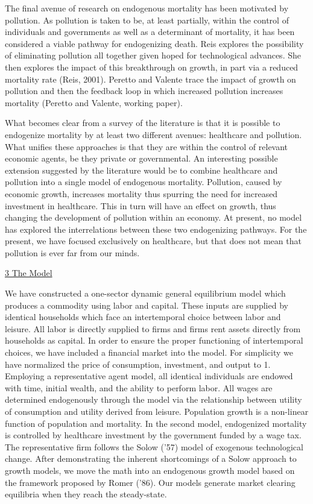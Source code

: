\documentclass[12pt]{article}%
\begin{document}
	The final avenue of research on endogenous mortality has been motivated by pollution. As pollution is taken to be, at least partially, within the control of individuals and governments as well as a determinant of mortality, it has been considered a viable pathway for endogenizing death. Reis explores the possibility of eliminating pollution all together given hoped for technological advances. She then explores the impact of this breakthrough on growth, in part via a reduced mortality rate (Reis, 2001). Peretto and Valente trace the impact of growth on pollution and then the feedback loop in which increased pollution increases mortality (Peretto and Valente, working paper).

	What becomes clear from a survey of the literature is that it is possible to endogenize mortality by at least two different avenues: healthcare and pollution. What unifies these approaches is that they are within the control of relevant economic agents, be they private or governmental. An interesting possible extension suggested by the literature would be to combine healthcare and pollution into a single model of endogenous mortality. Pollution, caused by economic growth, increases mortality thus spurring the need for increased investment in healthcare. This in turn will have an effect on growth, thus changing the development of pollution within an economy. At present, no model has explored the interrelations between these two endogenizing pathways. For the present, we have focused exclusively on healthcare, but that does not mean that pollution is ever far from our minds.

\underline{3 The Model}

We have constructed a one-sector dynamic general equilibrium model which produces a commodity using labor and capital. These inputs are supplied by identical households which face an intertemporal choice between labor and leisure. All labor is directly supplied to firms and firms rent assets directly from households as capital. In order to ensure the proper functioning of intertemporal choices, we have included a financial market into the model. For simplicity we have normalized the price of consumption, investment, and output to 1. Employing a representative agent model, all identical individuals are endowed with time, initial wealth, and the ability to perform labor. All wages are determined endogenously through the model via the relationship between utility of consumption and utility derived from leisure. Population growth is a non-linear function of population and mortality. In the second model, endogenized mortality is controlled by healthcare investment by the government funded by a wage tax. The representative firm follows the Solow (’57) model of exogenous technological change. After demonstrating the inherent shortcomings of a Solow approach to growth models, we move the math into an endogenous growth model based on the framework proposed by Romer (’86). Our models generate market clearing equilibria when they reach the steady-state.
\end{document}
